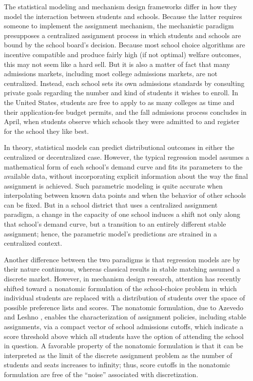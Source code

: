 \documentclass[12pt]{article}
\theoremstyle{definition}
\begin{document}
The statistical modeling and mechanism design frameworks differ in how they model the interaction between students and schools. Because the latter requires someone to implement the assignment mechanism, the mechanistic paradigm presupposes a centralized assignment process in which students and schools are bound by the school board's decision. Because most school choice algorithms are incentive compatible and produce fairly high (if not optimal) welfare outcomes, this may not seem like a hard sell. But it is also a matter of fact that many admissions markets, including most college admissions markets, are not centralized. Instead, each school sets its own admissions standards by consulting private goals regarding the number and kind of students it wishes to enroll. In the United States, students are free to apply to as many colleges as time and their application-fee budget permits, and the fall admissions process concludes in April, when students observe which schools they were admitted to and register for the school they like best.

In theory, statistical models can predict distributional outcomes in either the centralized or decentralized case. However, the typical regression model assumes a mathematical form of each school's demand curve and fits its parameters to the available data, without incorporating explicit information about the way the final assignment is achieved. Such parametric modeling is quite accurate when interpolating between known data points and when the behavior of other schools can be fixed. But in a school district that uses a centralized assignment paradigm, a change in the capacity of one school induces a shift not only along that school's demand curve, but a transition to an entirely different stable assignment; hence, the parametric model's predictions are strained in a centralized context. 

Another difference between the two paradigms is that regression models are by their nature continuous, whereas classical results in stable matching assumed a discrete market. However, in mechanism design research, attention has recently shifted toward a nonatomic formulation of the school-choice problem in which individual students are replaced with a distribution of students over the space of possible preference lists and scores. The nonatomic formulation, due to Azevedo and Leshno \parencite*{supplydemandfw}, enables the characterization of assignment policies, including stable assignments, via a compact vector of school admissions cutoffs, which indicate a score threshold above which all students have the option of attending the school in question. A favorable property of the nonatomic formulation is that it can be interpreted as the limit of the discrete assignment problem as the number of students and seats increases to infinity; thus, score cutoffs in the nonatomic formulation are free of the ``noise'' associated with discretization. 
\end{document}
